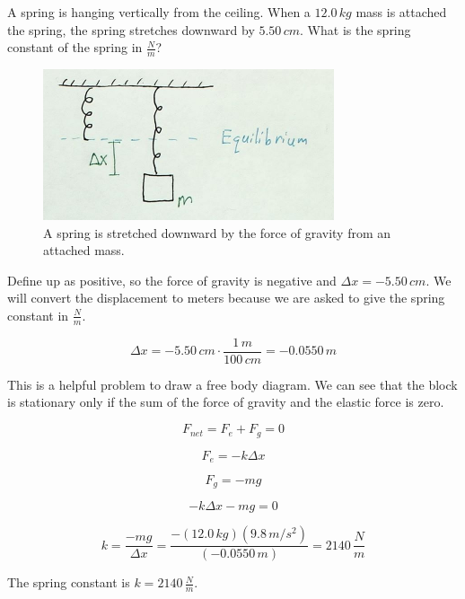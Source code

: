 \documentclass[12pt]{book}
\begin{document}
\begin{exampleblock}

A spring is hanging vertically from the ceiling. When a $12.0 \, kg$ mass is attached the spring, the spring stretches downward by $5.50 \, cm$. What is the spring constant of the spring in $\frac{N}{m}$?

\begin{figure}[H]
\centering
\includegraphics[scale=1.0]{spring_weight.png}
\caption{A spring is stretched downward by the force of gravity from an attached mass.}
\label{springweight}
\end{figure}

\hspace{10pt}

 Define up as positive, so the force of gravity is negative and $\Delta x = -5.50 \, cm$. We will convert the displacement to meters because we are asked to give the spring constant in $\frac{N}{m}$.

\begin{equation}
\Delta x = -5.50 \, cm \cdot \frac{1 \, m}{100 \, cm} = -0.0550 \, m
\end{equation}

This is a helpful problem to draw a free body diagram. We can see that the block is stationary only if the sum of the force of gravity and the elastic force is zero.

\begin{equation}
F_{net} = F_e + F_g = 0
\end{equation}

\begin{equation}
F_e = -k \Delta x
\end{equation}

\begin{equation}
F_g = -mg
\end{equation}

\begin{equation}
-k \Delta x - mg = 0
\end{equation}

\begin{equation}
k = \frac{-mg}{\Delta x} = \frac{-(12.0 \, kg) (9.8 \, m/s^2)}{(-0.0550 \, m)} = 2140 \, \frac{N}{m}
\end{equation}

The spring constant is $k = 2140 \, \frac{N}{m}$.

\end{exampleblock}
\end{document}
